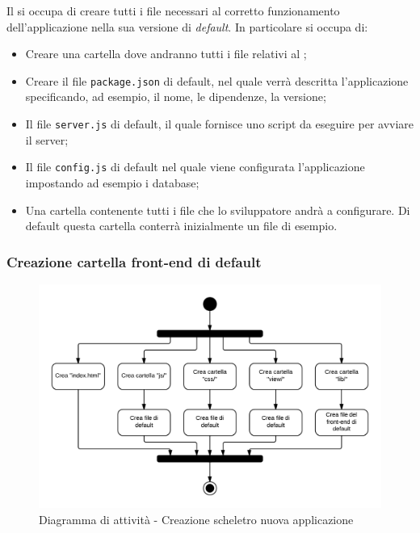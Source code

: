 Il   si occupa di creare tutti i file necessari al corretto funzionamento dell'applicazione nella sua versione di \textit{default}. In particolare si occupa di:

\begin{itemize}

	\item Creare una cartella dove andranno tutti i file relativi al ;
	\item Creare il file \texttt{package.json} di default, nel quale verrà descritta l'applicazione specificando, ad esempio, il nome, le dipendenze, la versione;
	\item Il file \texttt{server.js} di default, il quale fornisce uno script da eseguire per avviare il server;
	\item Il file \texttt{config.js} di default nel quale viene configurata l'applicazione impostando ad esempio i database;
	\item Una cartella contenente tutti i file  che lo sviluppatore andrà a configurare. Di default questa cartella conterrà inizialmente un file  di esempio.

\end{itemize}

\subsubsection{Creazione cartella front-end di default}

\begin{figure}[H]
\centering
\includegraphics[scale=0.2]{uml/Framework - Crea cartella front-end di default.png}
\caption{Diagramma di attività - Creazione scheletro nuova applicazione}
\end{figure}

